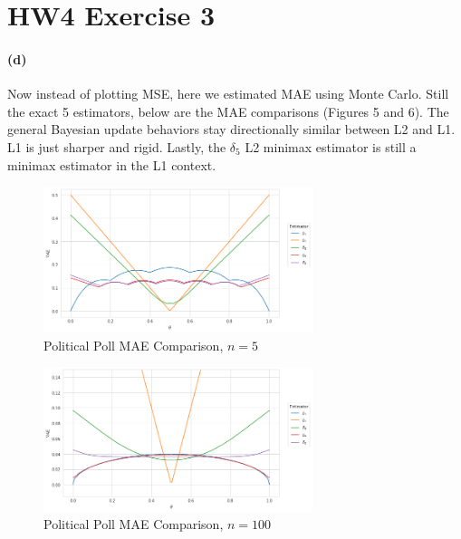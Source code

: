 \documentclass[11pt, letterpaper]{article}
\author{Ryan Tang}
\date{October 7th 2022}
\begin{document}
\maketitle

\section{HW4 Exercise 3}
\paragraph{(d)}
Now instead of plotting MSE, here we estimated MAE using Monte Carlo. Still the exact 5 estimators, below are the MAE comparisons (Figures 5 and 6). The general Bayesian update behaviors stay directionally similar between L2 and L1. L1 is just sharper and rigid. Lastly, the $\delta_5$ L2 minimax estimator is still a minimax estimator in the L1 context.
\begin{figure}[!h]
  \centering
  \includegraphics[width=0.7\textwidth]{3.d.1.png}
  \captionsetup{justification=centering}
  \caption{Political Poll MAE Comparison, $n = 5$}
\end{figure}

\begin{figure}[!h]
  \centering
  \includegraphics[width=0.7\textwidth]{3.d.2.png}
  \captionsetup{justification=centering}
  \caption{Political Poll MAE Comparison, $n = 100$}
\end{figure}
\end{document}

